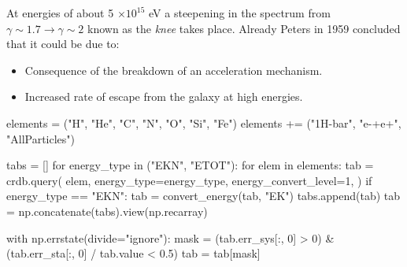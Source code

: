 \documentclass[
  letterpaper,
  DIV=11,
  numbers=noendperiod]{scrreprt}
\newenvironment{Shaded}{\begin{snugshade}}{\end{snugshade}}
\newcommand{\ControlFlowTok}[1]{\textcolor[rgb]{0.00,0.23,0.31}{#1}}
\newcommand{\DecValTok}[1]{\textcolor[rgb]{0.68,0.00,0.00}{#1}}
\newcommand{\FloatTok}[1]{\textcolor[rgb]{0.68,0.00,0.00}{#1}}
\newcommand{\KeywordTok}[1]{\textcolor[rgb]{0.00,0.23,0.31}{#1}}
\newcommand{\NormalTok}[1]{\textcolor[rgb]{0.00,0.23,0.31}{#1}}
\newcommand{\OperatorTok}[1]{\textcolor[rgb]{0.37,0.37,0.37}{#1}}
\newcommand{\StringTok}[1]{\textcolor[rgb]{0.13,0.47,0.30}{#1}}
\providecommand{\tightlist}{%
  \setlength{\itemsep}{0pt}\setlength{\parskip}{0pt}}\usepackage{longtable,booktabs,array}
\begin{document}
At energies of about 5 \(\times 10^{15}\) eV a steepening in the
spectrum from \(\gamma \sim 1.7 \rightarrow \gamma \sim 2\) known as the
\emph{knee} takes place. Already Peters in 1959 concluded that it could
be due to:

\begin{itemize}
\tightlist
\item
  Consequence of the breakdown of an acceleration mechanism.
\item
  Increased rate of escape from the galaxy at high energies.
\end{itemize}

\begin{Shaded}
\begin{Highlighting}[]
\NormalTok{elements }\OperatorTok{=}\NormalTok{ (}\StringTok{"H"}\NormalTok{, }\StringTok{"He"}\NormalTok{, }\StringTok{"C"}\NormalTok{, }\StringTok{"N"}\NormalTok{, }\StringTok{"O"}\NormalTok{, }\StringTok{"Si"}\NormalTok{, }\StringTok{"Fe"}\NormalTok{)}
\NormalTok{elements }\OperatorTok{+=}\NormalTok{ (}\StringTok{"1H{-}bar"}\NormalTok{, }\StringTok{"e{-}+e+"}\NormalTok{, }\StringTok{"AllParticles"}\NormalTok{)}

\NormalTok{tabs }\OperatorTok{=}\NormalTok{ []}
\ControlFlowTok{for}\NormalTok{ energy\_type }\KeywordTok{in}\NormalTok{ (}\StringTok{"EKN"}\NormalTok{, }\StringTok{"ETOT"}\NormalTok{):}
    \ControlFlowTok{for}\NormalTok{ elem }\KeywordTok{in}\NormalTok{ elements:}
\NormalTok{        tab }\OperatorTok{=}\NormalTok{ crdb.query(}
\NormalTok{            elem,}
\NormalTok{            energy\_type}\OperatorTok{=}\NormalTok{energy\_type,}
\NormalTok{            energy\_convert\_level}\OperatorTok{=}\DecValTok{1}\NormalTok{,}
\NormalTok{        )}
        \ControlFlowTok{if}\NormalTok{ energy\_type }\OperatorTok{==} \StringTok{"EKN"}\NormalTok{:}
\NormalTok{            tab }\OperatorTok{=}\NormalTok{ convert\_energy(tab, }\StringTok{"EK"}\NormalTok{)}
\NormalTok{        tabs.append(tab)}
\NormalTok{tab }\OperatorTok{=}\NormalTok{ np.concatenate(tabs).view(np.recarray)}

\ControlFlowTok{with}\NormalTok{ np.errstate(divide}\OperatorTok{=}\StringTok{"ignore"}\NormalTok{):}
\NormalTok{    mask }\OperatorTok{=}\NormalTok{ (tab.err\_sys[:, }\DecValTok{0}\NormalTok{] }\OperatorTok{\textgreater{}} \DecValTok{0}\NormalTok{) }\OperatorTok{\&}\NormalTok{ (tab.err\_sta[:, }\DecValTok{0}\NormalTok{] }\OperatorTok{/}\NormalTok{ tab.value }\OperatorTok{\textless{}} \FloatTok{0.5}\NormalTok{)}
\NormalTok{tab }\OperatorTok{=}\NormalTok{ tab[mask]}


\end{Highlighting}
\end{Shaded}
\end{document}

